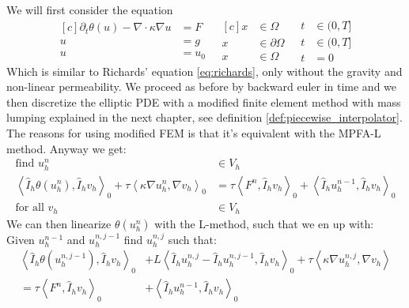 \documentclass[../Main/main.tex]{subfiles}
\begin{document}
	
	We will first consider the equation
	\begin{equation}\label{eq:richards simple}
		\begin{aligned}[c]
			\partial_t \theta(u) - \nabla \cdot \kappa \nabla u &= F \\
			u &= g \\
			u &= u_0
		\end{aligned}
		\ \ \
		\begin{aligned}[c]
			x &\in \Omega  \\
			x &\in \partial \Omega \\
			x &\in \Omega  
		\end{aligned}
		\ \ \
		\begin{aligned}
			t&\in (0,T] \\
			t&\in (0,T] \\
			t&=0
		\end{aligned}
	\end{equation}
	Which is similar to Richards' equation \eqref{eq:richards}, only without the gravity and non-linear permeability. We proceed as before by backward euler in time and we then discretize the elliptic PDE with a modified finite element method with mass lumping explained in the next chapter, see definition \ref{def:piecewise_interpolator}. The reasons for using modified FEM is that it's equivalent with the MPFA-L method. Anyway we get:
	\begin{equation}\label{eq:richards_timedisc}
		\begin{aligned}
			\text{find }u_h^n&\in V_h\\
			\left \langle \hat{I}_h \theta(u_h^n),\hat{I}_h v_h \right \rangle_0 +\tau \left \langle \kappa \nabla u^n_h, \nabla v_h \right \rangle_0 &= \tau \left \langle F^n,\hat{I}_h v_h \right \rangle_0 + \left \langle \hat{I}_h u_h^{n-1},\hat{I}_h v_h \right \rangle_0 \\
			\text{for all }v_h &\in V_h
		\end{aligned}
	\end{equation}
	We can then linearize $\theta(u^n_h)$ with the L-method, such that we en up with: Given $u^{n-1}_h$ and $u^{n,j-1}_h$ find $u^{n,j}_h$ such that:
	\begin{equation}\label{eq:L-scheme-FEM}
		\begin{aligned}
			\left \langle \hat{I}_h \theta(u^{n,j-1}_h),\hat{I}_h v_h \right \rangle_0 &+ L \left \langle \hat{I}_h u^{n,j}_h -  \hat{I}_h u^{n,j-1}_h,\hat{I}_h v_h \right \rangle_0 + \tau \left \langle \kappa \nabla u^{n,j}_h,\nabla v_h \right \rangle \\=\tau \left \langle F^n,\hat{I}_h v_h \right \rangle_0 &+ \left \langle \hat{I}_h u_h^{n-1},\hat{I}_h v_h \right \rangle_0 
		\end{aligned}
	\end{equation}
\end{document}
